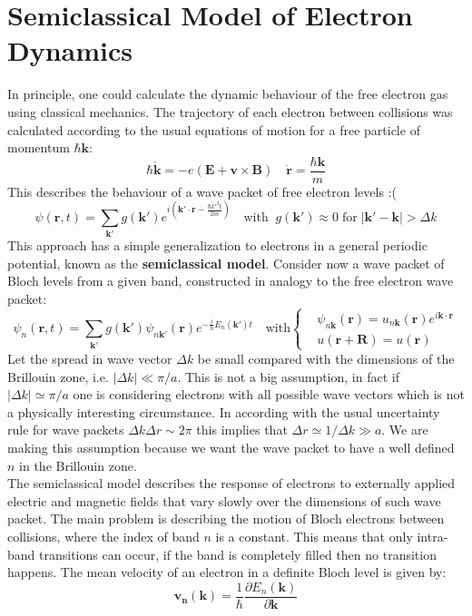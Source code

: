 \documentclass[10.75pt,a4paper,openright,bottom=2cm]{article}
\renewcommand{\Vec}[1]{\boldsymbol{#1}}
\begin{document}
\section{Semiclassical Model of Electron Dynamics}
In principle, one could calculate the dynamic behaviour of the free electron gas using classical mechanics. The trajectory of each electron between collisions was calculated according to the usual equations of motion for a free particle of momentum $\hbar\Vec{k}$:
\[
\hbar\Vec{\Dot{k}}=-e(\Vec{E}+\Vec{v}\times\Vec{B}) \quad \Vec{\Dot{r}}=\frac{\hbar\Vec{k}}{m}
\]
This describes the behaviour of a wave packet of free electron levels :(
\[
\psi(\Vec{r},t)=\sum_{\Vec{k'}}g(\Vec{k'})e^{i\left(\Vec{k'}\cdot\Vec{r}-\frac{\hbar k'^2t}{2m}\right)} \quad \text{with}\;\;g(\Vec{k'})\approx0\;\text{for}\;|\Vec{k'}-\Vec{k}|>\Delta k
\]
This approach has a simple generalization to electrons in a general periodic potential, known as the \textbf{semiclassical model}. Consider now a wave packet of Bloch levels from a given band, constructed in analogy to the free electron wave packet:
\[
\psi_n(\Vec{r},t)=\sum_{\Vec{k'}}g(\Vec{k'})\psi_{n\Vec{k'}}(\Vec{r})e^{-\frac{i}{h}E_n(\Vec{k'})t} \quad \text{with}
\left\{
\begin{aligned}
&\psi_{n\Vec{k}}(\Vec{r})=u_{n\Vec{k}}(\Vec{r})e^{i\Vec{k}\cdot\Vec{r}}\\
&u(\Vec{r}+\Vec{R})=u(\Vec{r})
\end{aligned}
\right.
\]
Let the spread in wave vector $\Delta k$ be small compared with the dimensions of the Brillouin zone, i.e. $|\Delta k|\ll\pi/a$. This is not a big assumption, in fact if $|\Delta k|\simeq\pi/a$ one is considering electrons with all possible wave vectors which is not a physically interesting circumstance. In according with the usual uncertainty rule for wave packets $\Delta k\Delta r\sim2\pi$ this implies that $\Delta r\simeq1/\Delta k\gg a$. We are making this assumption because we want the wave packet to have a well defined $n$ in the  Brillouin zone.\\
The semiclassical model describes the response of electrons to externally applied electric and magnetic fields that vary slowly over the dimensions of such wave packet. The main problem is describing the motion of Bloch electrons between collisions, where the index of band $n$ is a constant. This means that only intra-band transitions can occur, if the band is completely filled then no transition happens. The mean velocity of an electron in a definite Bloch level is given by:
\[
\Vec{v_n}(\Vec{k})=\frac{1}{\hbar}\frac{\partial E_n(\Vec{k})}{\partial\Vec{k}}
\]
\end{document}
